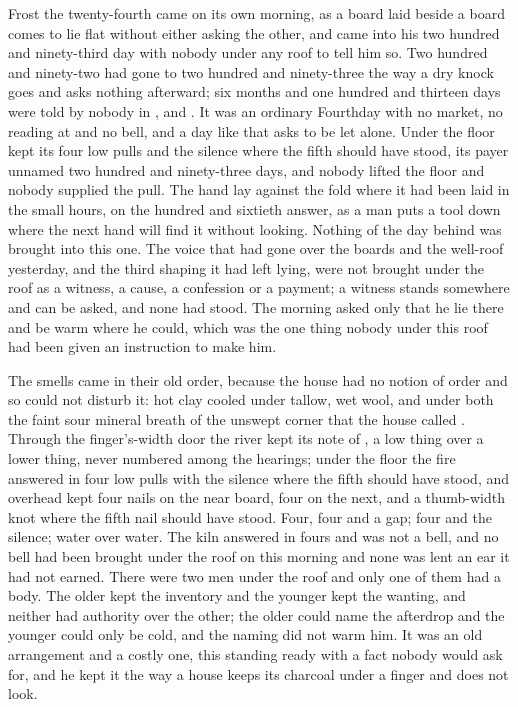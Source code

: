 
Frost the twenty-fourth came on its own morning, as a board laid beside a board comes to lie flat without either asking the other, and  came into his two hundred and ninety-third day with nobody under any roof to tell him so. Two hundred and ninety-two had gone to two hundred and ninety-three the way a dry knock goes and asks nothing afterward; six months and one hundred and thirteen days were told by nobody in ,  and . It was an ordinary Fourthday with no market, no reading at  and no bell, and a day like that asks to be let alone. Under the floor  kept its four low pulls and the silence where the fifth should have stood, its payer unnamed two hundred and ninety-three days, and nobody lifted the floor and nobody supplied the pull. The hand lay against the fold where it had been laid in the small hours, on the hundred and sixtieth answer, as a man puts a tool down where the next hand will find it without looking. Nothing of the day behind was brought into this one. The voice that had gone over the boards and the well-roof yesterday, and the third shaping it had left lying, were not brought under the roof as a witness, a cause, a confession or a payment; a witness stands somewhere and can be asked, and none had stood. The morning asked only that he lie there and be warm where he could, which was the one thing nobody under this roof had been given an instruction to make him.

The smells came in their old order, because the house had no notion of order and so could not disturb it: hot clay cooled under tallow, wet wool, and under both the faint sour mineral breath of the unswept corner that the house called . Through the finger's-width door the river kept its note of , a low thing over a lower thing, never numbered among the hearings; under the floor the fire answered in four low pulls with the silence where the fifth should have stood, and overhead  kept four nails on the near board, four on the next, and a thumb-width knot where the fifth nail should have stood. Four, four and a gap; four and the silence; water over water. The kiln answered in fours and was not a bell, and no bell had been brought under the roof on this morning and none was lent an ear it had not earned. There were two men under the roof and only one of them had a body. The older kept the inventory and the younger kept the wanting, and neither had authority over the other; the older could name the afterdrop and the younger could only be cold, and the naming did not warm him. It was an old arrangement and a costly one, this standing ready with a fact nobody would ask for, and he kept it the way a house keeps its charcoal under a finger and does not look.

